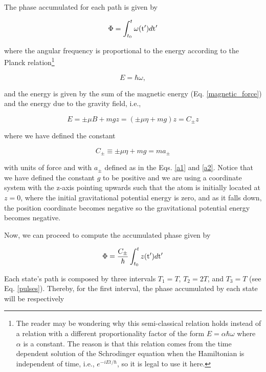 \documentclass{article}
\begin{document}
The phase accumulated for each path is given by

\begin{equation}
\Phi = \int_{t_{0}}^{t} \omega(\ce{^{}_{}t{'}_{}})d\ce{^{}_{}t{'}_{}}
\end{equation}

where the angular frequency is proportional to the energy according to the Planck relation\footnote{The reader may be wondering why this semi-classical relation holds instead of a relation with a different proportionality factor of the form $E = \alpha \hbar \omega$ where $\alpha$ is a constant. The reason is that this relation comes from the time dependent solution of the Schrodinger equation when the Hamiltonian is independent of time, i.e., $e^{-i E t/\hbar}$, so it is legal to use it here.}

\begin{equation}\label{planck_relation}
E = \hbar \omega, 
\end{equation}

and the energy is given by the sum of the magnetic energy (Eq. \ref{magnetic_force}) and the energy due to the gravity field, i.e.,

\begin{equation}\label{classic_energy}
E = \pm \mu B + mgz = (\pm \mu \eta + mg)z = C_{\pm} z
\end{equation}

where we have defined the constant

\begin{equation}\label{c_definition}
C_{\pm} \equiv \pm \mu \eta + mg = m a_{\pm}
\end{equation}

with units of force and with $a_{\pm}$ defined as in the Eqs. \ref{a1} and \ref{a2}. Notice that we have defined the constant $g$ to be positive and we are using a coordinate system with the z-axis pointing upwards such that the atom is initially located at $z=0$, where the initial gravitational potential energy is zero, and as it falls down, the position coordinate becomes negative so the gravitational potential energy becomes negative.

Now, we can proceed to compute the accumulated phase given by

\begin{equation}\label{semi_classical_phase}
\Phi = \frac{C_{\pm}}{\hbar} \int_{t_{0}}^{t} z(\ce{^{}_{}t{'}_{}})d\ce{^{}_{}t{'}_{}}
\end{equation}

Each state's path is composed by three intervals $T_{1}=T$, $T_{2}=2T$, and $T_{3}=T$ (see Eq. \ref{pulses}). Thereby, for the first interval, the phase accumulated by each state will be respectively
\end{document}
